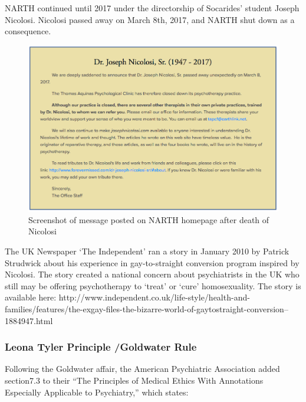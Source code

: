 \begin{refsection}
NARTH continued until 2017 under the directorship of Socarides' student Joseph Nicolosi. Nicolosi passed away on March 8th, 2017, and NARTH shut down as a consequence.

\begin{figure}
 \begin{center}

 
\includegraphics{../images/Nicolosi-Obit-2017.png}
\end{center}
 \caption{Screenshot of message posted on NARTH homepage after death of Nicolosi}
\label{fig: nicolosi}
\end{figure}


The UK Newspaper `The Independent' ran a story in January 2010 by Patrick Strudwick about his experience in gay-to-straight conversion program inspired by Nicolosi. The story created a national concern about psychiatrists in the UK who still may be offering psychotherapy to `treat' or `cure' homosexuality. The story is available here: http:\slash \slash www.independent.co.uk\slash life-style\slash health-and-families\slash features\slash the-exgay-files-the-bizarre-world-of-gaytostraight-conversion--1884947.html

\subsubsection{Leona Tyler Principle \slash  Goldwater Rule}
\label{leonatylerprinciplegoldwaterrule}

Following the Goldwater affair, the American Psychiatric Association added section7.3 to their ``The Principles of Medical Ethics With Annotations Especially Applicable to Psychiatry,'' which states:


\end{refsection}
